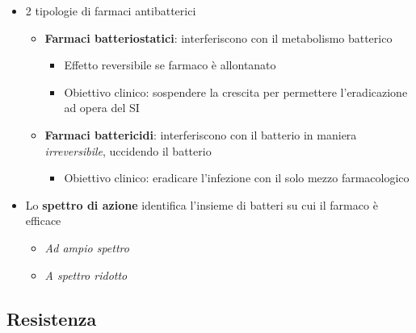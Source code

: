 \documentclass[italian,]{article}
\providecommand{\tightlist}{%
  \setlength{\itemsep}{0pt}\setlength{\parskip}{0pt}}
\begin{document}
\begin{itemize}
\tightlist
\item
  2 tipologie di farmaci antibatterici

  \begin{itemize}
  \tightlist
  \item
    \textbf{Farmaci batteriostatici}: interferiscono con il metabolismo
    batterico

    \begin{itemize}
    \tightlist
    \item
      Effetto reversibile se farmaco è allontanato
    \item
      Obiettivo clinico: sospendere la crescita per permettere
      l'eradicazione ad opera del SI
    \end{itemize}
  \item
    \textbf{Farmaci battericidi}: interferiscono con il batterio in
    maniera \emph{irreversibile}, uccidendo il batterio

    \begin{itemize}
    \tightlist
    \item
      Obiettivo clinico: eradicare l'infezione con il solo mezzo
      farmacologico
    \end{itemize}
  \end{itemize}
\item
  Lo \textbf{spettro di azione} identifica l'insieme di batteri su cui
  il farmaco è efficace

  \begin{itemize}
  \tightlist
  \item
    \emph{Ad ampio spettro}
  \item
    \emph{A spettro ridotto}
  \end{itemize}
\end{itemize}

\hypertarget{resistenza}{%
\subsection{Resistenza}\label{resistenza}}
\end{document}
